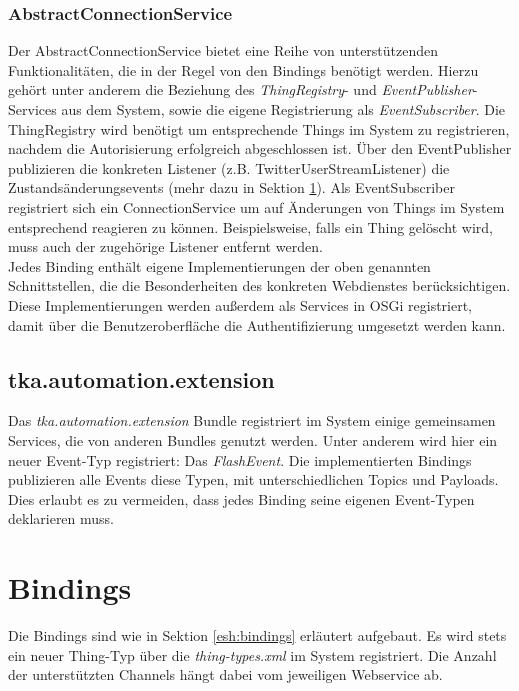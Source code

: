 \subsubsection{AbstractConnectionService}
Der AbstractConnectionService bietet eine Reihe von unterstützenden Funktionalitäten, die in der Regel von den Bindings benötigt werden. Hierzu gehört unter anderem die Beziehung des \textit{ThingRegistry}- und \textit{EventPublisher}-Services aus dem System, sowie die eigene Registrierung als \textit{EventSubscriber}. Die ThingRegistry wird benötigt um entsprechende Things im System zu registrieren, nachdem die Autorisierung erfolgreich abgeschlossen ist. Über den EventPublisher publizieren die konkreten Listener (z.B. TwitterUserStreamListener) die Zustandsänderungsevents (mehr dazu in Sektion \ref{sec:bindings_impl}). Als EventSubscriber registriert sich ein ConnectionService um auf Änderungen von Things im System entsprechend reagieren zu können. Beispielsweise, falls ein Thing gelöscht wird, muss auch der zugehörige Listener entfernt werden.\\



Jedes Binding enthält eigene Implementierungen der oben genannten Schnittstellen, die die Besonderheiten des konkreten Webdienstes berücksichtigen. Diese Implementierungen werden außerdem als Services in OSGi registriert, damit über die Benutzeroberfläche die Authentifizierung umgesetzt werden kann.


\subsection{tka.automation.extension}
Das \textit{tka.automation.extension} Bundle registriert im System einige gemeinsamen Services, die von anderen Bundles genutzt werden. Unter anderem wird hier ein neuer Event-Typ registriert: Das \textit{FlashEvent}. Die implementierten Bindings publizieren alle Events diese Typen, mit unterschiedlichen Topics und Payloads. Dies erlaubt es zu vermeiden, dass jedes Binding seine eigenen Event-Typen deklarieren muss. 


\section{Bindings}
\label{sec:bindings_impl}
Die Bindings sind wie in Sektion \ref{esh:bindings} erläutert aufgebaut. Es wird stets ein neuer Thing-Typ über die \textit{thing-types.xml} im System registriert. Die Anzahl der unterstützten Channels hängt dabei vom jeweiligen Webservice ab.


